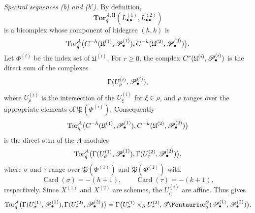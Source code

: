 \begin{env}[6.6.4]
\label{III.6.6.4}
\emph{Spectral sequences \textnormal{(b)} and
\textnormal{(b$'$)}.}
By definition,
\[
  \mathbf{Tor}_q^{A,\mathrm{II}}
  (L_{\bullet\bullet}^{(1)},L_{\bullet\bullet}^{(2)})
\]
is a bicomplex whose component of bidegree $(h,k)$ is
\[
  \operatorname{Tor}_q^A
  \bigl(
    C^{-h}(\mathfrak U^{(1)},\mathscr{P}_\bullet^{(1)}),
    C^{-k}(\mathfrak U^{(2)},\mathscr{P}_\bullet^{(2)})
  \bigr).
\]
Let $\Phi^{(i)}$ be the index set of $\mathfrak U^{(i)}$.  For
$r\geq0$, the complex
$C^r(\mathfrak U^{(i)},\mathscr{P}_\bullet^{(i)})$ is the direct sum
of the complexes
\[
  \Gamma(U_\rho^{(i)},\mathscr{P}_\bullet^{(i)}),
\]
where $U_\rho^{(i)}$ is the intersection of the
$U_\xi^{(i)}$ for $\xi\in\rho$, and $\rho$ ranges over the
appropriate elements of $\mathfrak P(\Phi^{(i)})$.
Consequently
\[
  \operatorname{Tor}_q^A
  \bigl(
    C^{-h}(\mathfrak U^{(1)},\mathscr{P}_\bullet^{(1)}),
    C^{-k}(\mathfrak U^{(2)},\mathscr{P}_\bullet^{(2)})
  \bigr)
\]
is the direct sum of the $A$-modules
\[
  \operatorname{Tor}_q^A
  \bigl(
    \Gamma(U_\sigma^{(1)},\mathscr{P}_\bullet^{(1)}),
    \Gamma(U_\tau^{(2)},\mathscr{P}_\bullet^{(2)})
  \bigr),
\]
where $\sigma$ and $\tau$ range over
$\mathfrak P(\Phi^{(1)})$ and $\mathfrak P(\Phi^{(2)})$ with
\[
  \operatorname{Card}(\sigma)=-(h+1),
  \qquad
  \operatorname{Card}(\tau)=-(k+1),
\]
respectively.  Since $X^{(1)}$ and $X^{(2)}$ are schemes, the
$U_\rho^{(i)}$ are affine.  Thus  gives
\[
  \Tor_q^A
  \bigl(
    \Gamma(U_\sigma^{(1)},\sh P_\bullet^{(1)}),
    \Gamma(U_\tau^{(2)},\sh P_\bullet^{(2)})
  \bigr)
  =
  \Gamma\bigl(
    U_\sigma^{(1)}\times_SU_\tau^{(2)},
    \shTor_q^S(\sh P_\bullet^{(1)},\sh P_\bullet^{(2)})
  \bigr).
\]



\end{env}
